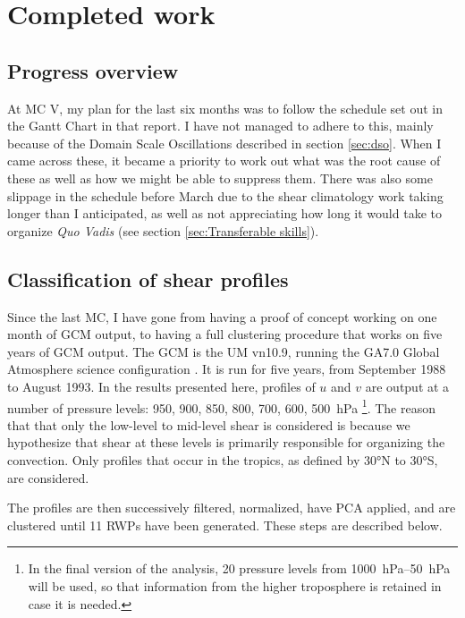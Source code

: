 \documentclass[11pt,a4paper]{article}
\begin{document}
\section{Completed work}
\label{sec:Completed work}

\subsection{Progress overview}
\label{sec:Progress overview}

At MC V, my plan for the last six months was to follow the schedule set out in the Gantt Chart in that report. I have not managed to adhere to this, mainly because of the Domain Scale Oscillations described in section \ref{sec:dso}. When I came across these, it became a priority to work out what was the root cause of these as well as how we might be able to suppress them. There was also some slippage in the schedule before March due to the shear climatology work taking longer than I anticipated, as well as not appreciating how long it would take to organize \textit{Quo Vadis} (see section \ref{sec:Transferable skills}).

\subsection{Classification of shear profiles}
\label{sec:Classification of shear profiles}
Since the last MC, I have gone from having a proof of concept working on one month of GCM output, to having a full clustering procedure that works on five years of GCM output. The GCM is the UM vn10.9, running the GA7.0 Global Atmosphere science configuration \parencite{walters2018met}. It is run for five years, from September 1988 to August 1993. In the results presented here, profiles of $u$ and $v$ are output at a number of pressure levels: \SI{950}{}, \SI{900}{}, \SI{850}{}, \SI{800}{}, \SI{700}{}, \SI{600}{}, \SI{500}{hPa} \footnote{In the final version of the analysis, 20 pressure levels from \SIrange{1000}{50}{hPa} will be used, so that information from the higher troposphere is retained in case it is needed.}. The reason that that only the low-level to mid-level shear is considered is because we hypothesize that shear at these levels is primarily responsible for organizing the convection. Only profiles that occur in the tropics, as defined by 30\si{\degree}N to 30\si{\degree}S, are considered.

The profiles are then successively filtered, normalized, have PCA applied, and are clustered until 11 RWPs have been generated. These steps are described below.
\end{document}
